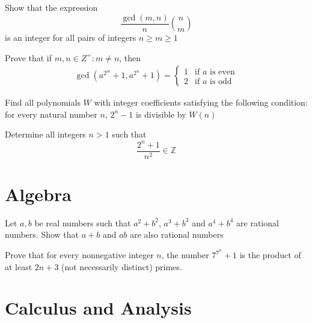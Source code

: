 \begin{problem}[N][5][Putnam 2000]
    Show that the expression 
    $$ \frac{\gcd(m,n)}{n} \binom{n}{m} $$
    is an integer for all pairs of integers $n \geq m \geq 1$
\end{problem}

\begin{problem}
    Prove that if $m,n \in Z^+: m \neq n$, then
    \begin{align*}
        \gcd \left(a^{2^m}+1, a^{2^n}+1\right) = 
        \begin{cases}
            1 & \text{if } a \text{ is even} \\
            2 & \text{if } a \text{ is odd}
        \end{cases}
    \end{align*}
\end{problem}

\begin{problem}[N][6][Polish 2003]
    Find all polynomials $W$ with integer coefficients satisfying the following condition: for every natural number $n$, $2^n-1$ is divisible by $W(n)$
\end{problem}

\begin{problem}[N][8][IMO 1990]
    Determine all integers $n>1$ such that
    $$\frac{2^n+1}{n^2} \in \mathbb{Z}$$
\end{problem}

\newpage

\section{Algebra}

\begin{problem}[A][4]
    Let $a,b$ be real numbers such that  $a^2+b^2$, $a^3+b^3$ and $a^4+b^4$ are rational numbers. Show that $a+b$ and $ab$ are also rational numbers
\end{problem}

\begin{problem}[A][9][USAMO 2007]
    Prove that for every nonnegative integer $n$, the number $7^{7^n}+1$ is the product of at least $2n + 3$ (not necessarily distinct) primes.
\end{problem}



\newpage

\section{Calculus and Analysis}




